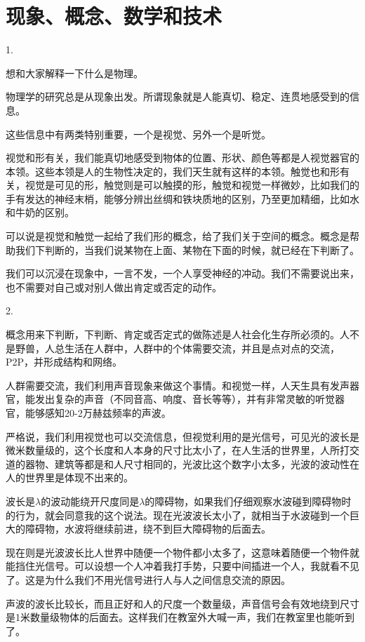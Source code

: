 \section{现象、概念、数学和技术}

1.

想和大家解释一下什么是物理。

物理学的研究总是从现象出发。所谓现象就是人能真切、稳定、连贯地感受到的信息。

这些信息中有两类特别重要，一个是视觉、另外一个是听觉。

视觉和形有关，我们能真切地感受到物体的位置、形状、颜色等都是人视觉器官的本领。这些本领是人的生物性决定的，我们天生就有这样的本领。触觉也和形有关，视觉是可见的形，触觉则是可以触摸的形，触觉和视觉一样微妙，比如我们的手有发达的神经末梢，能够分辨出丝绸和铁块质地的区别，乃至更加精细，比如水和牛奶的区别。

可以说是视觉和触觉一起给了我们形的概念，给了我们关于空间的概念。概念是帮助我们下判断的，当我们说某物在上面、某物在下面的时候，就已经在下判断了。

我们可以沉浸在现象中，一言不发，一个人享受神经的冲动。我们不需要说出来，也不需要对自己或对别人做出肯定或否定的动作。

2.

概念用来下判断，下判断、肯定或否定式的做陈述是人社会化生存所必须的。人不是野兽，人总生活在人群中，人群中的个体需要交流，并且是点对点的交流，P2P，并形成结构和网络。

人群需要交流，我们利用声音现象来做这个事情。和视觉一样，人天生具有发声器官，能发出复杂的声音（不同音高、响度、音长等等），并有非常灵敏的听觉器官，能够感知20-2万赫兹频率的声波。

严格说，我们利用视觉也可以交流信息，但视觉利用的是光信号，可见光的波长是微米数量级的，这个长度和人本身的尺寸比太小了，在人生活的世界里，人所打交道的器物、建筑等都是和人尺寸相同的，光波比这个数字小太多，光波的波动性在人的世界里是体现不出来的。

波长是$\lambda$的波动能绕开尺度同是$\lambda$的障碍物，如果我们仔细观察水波碰到障碍物时的行为，就会同意我的这个说法。现在光波波长太小了，就相当于水波碰到一个巨大的障碍物，水波将继续前进，绕不到巨大障碍物的后面去。

现在则是光波波长比人世界中随便一个物件都小太多了，这意味着随便一个物件就能挡住光信号。可以设想一个人冲着我打手势，只要中间插进一个人，我就看不见了。这是为什么我们不用光信号进行人与人之间信息交流的原因。

声波的波长比较长，而且正好和人的尺度一个数量级，声音信号会有效地绕到尺寸是1米数量级物体的后面去。这样我们在教室外大喊一声，我们在教室里也能听到了。

